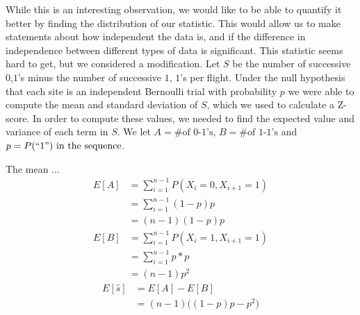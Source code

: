 \documentclass{article}
\begin{document}
	While this is an interesting observation, we would like to be able to 
quantify it better by finding the distribution of our statistic.  This would 
allow us to make statements about how independent the data is, and if the 
difference in independence between different types of data is significant.   
This statistic seems hard to get, but we considered a modification.  Let \(S\) 
be the number of successive \(0\),\(1\)'s minus the number of successive \(1\),
\(1\)'s per flight.  Under the null hypothesis that each site is an independent 
Bernoulli trial with probability \(p\) we were able to compute the mean and 
standard deviation of \(S\), which we used to calculate a Z-score.
	In order to compute these values, we needed to find the expected value and
variance of each term in \(S\).  We let \(A = \text{\# of 0-1's}\), 
\(B = \text{\# of 1-1's}\) and \(p = P(``1")\text{ in the sequence}\).

	The mean ...
 	\begin{align*}
        E[A] 
            &= \sum_{i=1}^{n-1} P(X_i = 0, X_{i+1} = 1) \\
            &= \sum_{i=1}^{n-1} (1-p)p \\
            &= (n-1)(1-p)p
    \end{align*}
    \begin{align*}
        E[B]
            &= \sum_{i=1}^{n-1} P(X_i = 1, X_{i+1} = 1) \\
            &= \sum_{i=1}^{n-1} p*p \\
            &= (n-1)p^2
    \end{align*}
	\begin{align*}
        E[\hat{s}] 
            &= E[A] - E[B] \\
            &= (n-1)\bigg((1-p)p - p^2\bigg)
    \end{align*}
\end{document}
